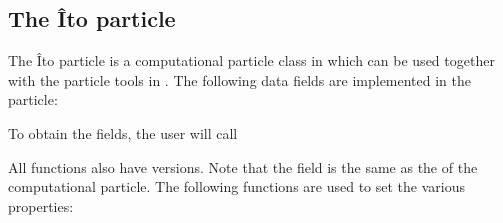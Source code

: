 \documentclass[letterpaper,10pt,english]{sphinxmanual}
\begin{document}
\subsection{The Îto particle}
\label{\detokenize{Ito:the-ito-particle}}\label{\detokenize{Ito:chap-ito-particle}}
The Îto particle is a computational particle class in  which can be used together with the particle tools in .
The following data fields are implemented in the particle:

\begin{sphinxVerbatim}[commandchars=\\\{\},formatcom=\scriptsize]
 
 
 
 
\end{sphinxVerbatim}

To obtain the fields, the user will call

\begin{sphinxVerbatim}[commandchars=\\\{\},formatcom=\scriptsize]
 
 
 
 
\end{sphinxVerbatim}

All functions also have  versions.
Note that the field  is the same as the  of the computational particle.
The following functions are used to set the various properties:

\begin{sphinxVerbatim}[commandchars=\\\{\},formatcom=\scriptsize]
  
  
  
  
\end{sphinxVerbatim}
\end{document}
